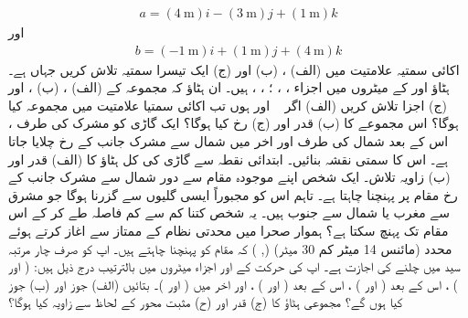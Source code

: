 \begin{align*} 
   a=(\SI{4}{\meter})i - (\SI{3}{\meter})j + (\SI{1}{\meter})k 
\end{align*}
    اور 
\begin{align*}
     b=(\SI{-1}{\meter})i + (\SI{1}{\meter})j + (\SI{4}{\meter})k 
\end{align*} 
   اکائی سمتیہ علامتیت میں  (الف)   ، (ب)   اور (ج) ایک تیسرا سمتیہ    تلاش کریں جہاں    ہے۔  
 ہٹاؤ    اور   کے میٹروں میں اجزاء  ،    ،  ؛   ،  ،  ہیں۔ ان ہٹاؤ کہ مجموعہ    کے  (الف) ، (ب) ، اور  (ج)  اجزا تلاش کریں  
  (الف) اگر  \   اور    ہوں تب اکائی سمتیا علامتیت میں مجموعہ   کیا ہوگا؟ اس مجموعے کا  (ب) قدر اور  (ج) رخ کیا ہوگا؟  
   ایک گاڑی کو مشرک کی طرف    ، اس کے بعد شمال کی طرف    اور اخر میں شمال سے مشرک جانب    کے رخ  چلایا جاتا ہے۔ اس کا سمتی نقشہ بنائیں۔ ابتدائی نقطہ سے گاڑی کی کل ہٹاؤ کا (الف) قدر اور  (ب) زاویہ تلاش۔   
ایک شخص اپنے موجودہ مقام سے    دور شمال سے مشرک جانب   کے رخ مقام پر پہنچنا چاہتا ہے۔ تاہم اس کو مجبوراً ایسی گلیوں سے گزرنا ہوگا جو مشرق سے مغرب یا شمال سے جنوب ہیں۔ یہ شخص کتنا کم سے کم فاصلہ طے کر کے اس مقام تک پہنچ سکتا ہے؟   
 ہموار صحرا میں  محدتی نظام کے ممتاز سے اغاز کرتے ہوئے   محدد (مائنس 14 میٹر کم 30 میٹر) (, ) کہ مقام کو پہنچنا چاہتے ہیں۔ اپ کو صرف چار مرتبہ سید میں چلنے کی اجازت ہے۔ اپ کی حرکت کے   اور    اجزاء میٹروں میں بالترتیب درج ذیل ہیں:   ( اور ) ، اس کے بعد   ( اور ) ، اس کے بعد   ( اور ) ، اور اخر میں  ( اور )۔  بتائیں  (الف) جوز   اور  (ب) جوز    کیا ہوں گے؟ مجموعی ہٹاؤ کا  (ج) قدر  اور  (ح) مثبت    محور کے لحاظ سے زاویہ کیا ہوگا؟   
